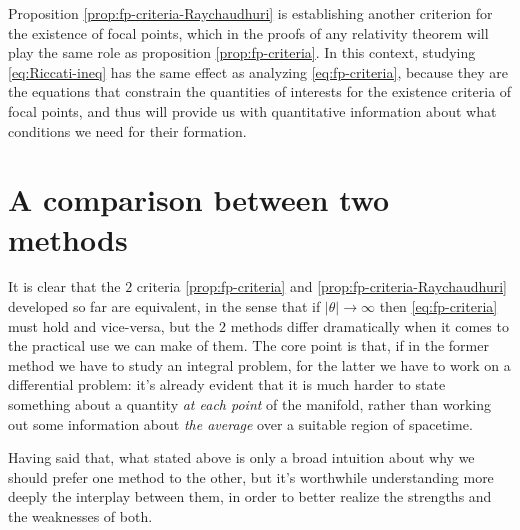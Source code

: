 	Proposition \ref{prop:fp-criteria-Raychaudhuri} is establishing another criterion for the existence of focal points, which in the proofs of any relativity theorem will play the same role as proposition \ref{prop:fp-criteria}. In this context, studying \ref{eq:Riccati-ineq} has the same effect as analyzing \ref{eq:fp-criteria}, because they are the equations that constrain the quantities of interests for the existence criteria of focal points, and thus will provide us with quantitative information about what conditions we need for their formation.
	
	\section{A comparison between two methods}
	It is clear that the \(2\) criteria \ref{prop:fp-criteria} and \ref{prop:fp-criteria-Raychaudhuri} developed so far are equivalent, in the sense that if \(\vert\theta\vert \rightarrow \infty\) then \eqref{eq:fp-criteria} must hold and vice-versa, but the \(2\) methods differ dramatically when it comes to the practical use we can make of them. The core point is that, if in the former method we have to study an integral problem, for the latter we have to work on a differential problem: it's already evident that it is much harder to state something about a quantity \emph{at each point} of the manifold, rather than working out some information about \emph{the average} over a suitable region of spacetime.
	
	Having said that, what stated above is only a broad intuition about why we should prefer one method to the other, but it's worthwhile understanding more deeply the interplay between them, in order to better realize the strengths and the weaknesses of both.
	

